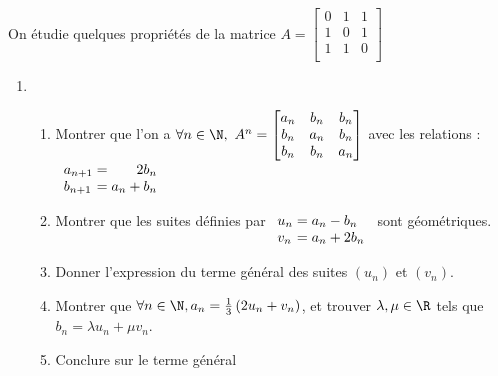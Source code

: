 \documentclass[12pt]{article}
\begin{document}
\begin{exercice}
  On étudie quelques propriétés de la matrice 
  $A = 
  \begin{bmatrix}
    0 & 1 & 1 \\ 
    1 & 0 & 1 \\ 
    1 & 1 & 0 \\ 
  \end{bmatrix}
  $
  \begin{enumerate}
    \item {}
      \begin{enumerate}
        \item 
          Montrer que l'on a 
          $
          \forall n \in \N, \ 
          A^n = 
          \begin{bmatrix}
            a_n & b_n & b_n \\ 
            b_n & a_n & b_n \\ 
            b_n & b_n & a_n \\ 
          \end{bmatrix}
          $
          avec les relations :
          $
          \begin{array}[t]{l@{}l@{}r}
            a_{n+1} & {} =     {} & 2 b_n    \\
            b_{n+1} & {} = a_n {} & {} + b_n \\
          \end{array}
          $

        \item 
          Montrer que les suites définies par 
          $
          \begin{array}[t]{l@{}l@{}l}
            u_n & {} = a_n {} & {} - b_n   \\
            v_n & {} = a_n {} & {} + 2 b_n \\
          \end{array}
            $
          sont géométriques.

        \item Donner l'expression du terme général des suites $(u_n)$ et $(v_n)$.
        \item Montrer que $\forall n \in \N, a_n = \frac{1}{3} \left ( 2 u_n + v_n \right )$, et trouver $\lambda, \mu \in \R$ tels que 
          $b_n = \lambda u_n + \mu v_n$. 
        \item Conclure sur le terme général 


\end{enumerate}
\end{enumerate}
\end{exercice}
\end{document}
